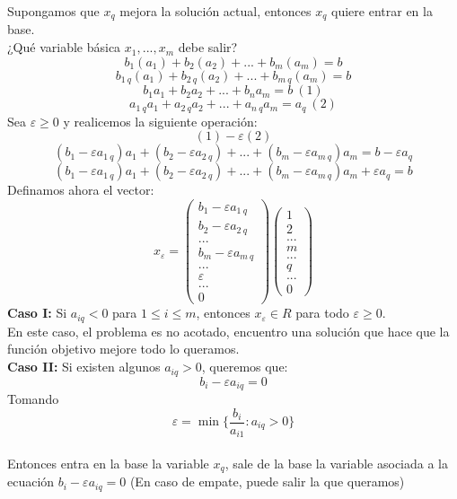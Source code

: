 \documentclass[11pt,fleqn]{book} %
\begin{document}
Supongamos que $x_q$ mejora la solución actual, entonces $x_q$ quiere entrar en la base. \\ ¿Qué variable básica $x_1, ..., x_m$ debe salir?
$$b_1(a_1)+b_2(a_2)+...+b_m(a_m)=b $$
$$b_{1~q}(a_1)+b_{2~q}(a_2)+...+b_{m~q}(a_m)=b $$
$$
b_1a_1+b_2a_2+...+b_na_m=b ~ (1)
$$
$$
a_{1~q}a_1+a_{2~q}a_2+...+a_{n~q}a_m=a_q ~(2)
$$
Sea $\varepsilon\geq0$ y realicemos la siguiente operación:
$$(1)-\varepsilon(2)$$
$$(b_1-\varepsilon a_{1 ~ q})a_1+(b_2-\varepsilon a_{2 ~ q})+...+(b_m-\varepsilon a_{m ~q})a_m=b-\varepsilon a_q$$
$$(b_1-\varepsilon a_{1 ~ q})a_1+(b_2-\varepsilon a_{2 ~ q})+...+(b_m-\varepsilon a_{m ~q})a_m+\varepsilon a_q=b$$
Definamos ahora el vector:
$$
x_\varepsilon=\left(
\begin{array}{c}
b_1-\varepsilon a_{1 ~ q} \\
b_2-\varepsilon a_{2 ~ q} \\ 
... \\
b_m-\varepsilon a_{m ~ q} \\
... \\
\varepsilon \\
... \\
0
\end{array}
\right)
\left(
\begin{array}{c}
1 \\
2 \\
... \\
m \\
... \\
q \\
... \\
0
\end{array}
\right)
$$
\textbf{Caso I: } Si $a_{iq}<0$ para $1\leq i \leq m$, entonces $x_\varepsilon \in R$ para todo $\varepsilon \geq 0$. \\
En este caso, el problema es no acotado, encuentro una solución que hace que la función objetivo mejore todo lo queramos. \\
\textbf{Caso II: } Si existen algunos $a_{iq}>0$, queremos que:
$$b_i-\varepsilon a_{iq}=0$$
Tomando $$\varepsilon=\min\{\frac{b_i}{a_{i1}} : a_{iq} > 0\}$$ \\
Entonces entra en la base la variable $x_q$, sale de la base la variable asociada a la ecuación $b_i-\varepsilon a_{iq}=0$ (En caso de empate, puede salir la que queramos)
\end{document}
